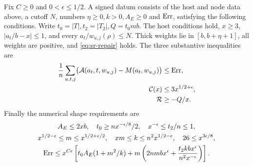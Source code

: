 \begin{srdefinition}
Fix \(C\geq0\) and \(0<\epsilon\leq1/2\). A signed datum consists of the
host and node data above, a cutoff \(N\), numbers \(\eta\geq0,k>0,A_E\geq0\)
and \({\rm Err}\), satisfying the following conditions.
Write \(t_0=|T|,t_2=|T_2|,Q=t_0mb\).
The host conditions hold, \(x\geq3\),
\(|a_t/b-x|\leq1\), and every \(a_t/w_{u,j}(\rho)\leq N\).
Thick weights lie in \([b,b+\eta+1]\), all weights are positive, and
\eqref{eq:sr-repair} holds. The three substantive inequalities are
\begin{align}
 \frac1n\sum_{u,t,j}\bigl({\cal A}(a_t,t,w_{u,j})-M(a_t,w_{u,j})\bigr)
       &\leq{\rm Err},\label{eq:sr-top}\\
 {\cal C}(x)&\leq3x^{1/2+\epsilon},\label{eq:sr-correction}\\
 {\cal R}&\geq-Q/x.\label{eq:sr-rest}
\end{align}
Finally the numerical shape requirements are
\begin{gather}
 A_E\leq2xb,\quad
 t_0\geq n x^{-\epsilon/8}/2,\quad
 x^{-\epsilon}\leq t_2/n\leq1,\label{eq:sr-shape1}\\
 x^{1/2-\epsilon}\leq m\leq x^{1/2+\epsilon/2},\quad
 xm\leq k\leq n^2x^{1/2-\epsilon},\quad
 26\leq x^{3\epsilon/8},\label{eq:sr-shape2}\\
 {\rm Err}\leq x^{C\epsilon}\left[
 t_0A_E(1+m^2/k)+m\left(2nmbx^\epsilon+
                 \frac{t_2kb x^\epsilon}{n^2x^{-\epsilon}}\right)\right].
 \label{eq:sr-error}
\end{gather}
\end{srdefinition}

